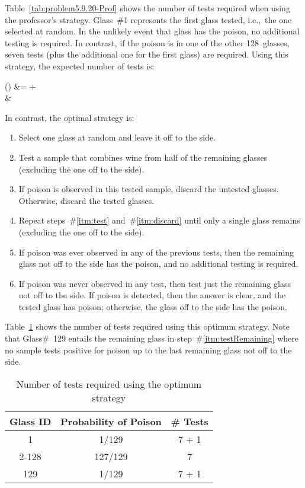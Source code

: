Table~\ref{tab:problem5.9.20-Prof} shows the number of tests required when using the professor's strategy.  Glass~\#1 represents the first glass tested, i.e.,~the one selected at random.  In the unlikely event that glass has the poison, no additional testing is required. In contrast, if the poison is in one of the other 128~glasses, seven tests (plus the additional one for the first glass) are required.  Using this strategy, the expected number of tests is:

\begin{aligncustom}
  () &=   +   \\
                                          &\approx {}
\end{aligncustom}


In contrast, the optimal strategy is:

\begin{enumerate}
  \item Select one glass at random and leave it off to the side.
  \item\label{itm:test} Test a sample that combines wine from half of the remaining glasses (excluding the one off to the side).
  \item\label{itm:discard} If poison is observed in this tested sample, discard the untested glasses.  Otherwise, discard the tested glasses.
  \item Repeat steps~\#\ref{itm:test} and~\#\ref{itm:discard} until only a single glass remains (excluding the one off to the side).
  \item If poison was ever observed in any of the previous tests, then the remaining glass not off to the side has the poison, and no additional testing is required.
  \item\label{itm:testRemaining} If poison was never observed in any test, then test just the remaining glass not off to the side. If poison is detected, then the answer is clear, and the tested glass has poison; otherwise, the glass off to the side has the poison.
\end{enumerate}

Table~\ref{tab:problem5.9.20-Opt} shows the number of tests required using this optimum strategy.    Note that Glass\#~129 entails the remaining glass in step~\#\ref{itm:testRemaining} where no sample tests positive for poison up to the last remaining glass not off to the side.

\begin{table}[h]
  \centering
  \begin{tabular}{c|c|c}
    \hline
    Glass ID & Probability of Poison & \# Tests  \\\hline
    1        & 1/129                 & 7 + 1     \\\hline
    2-128    & 127/129               & 7         \\\hline
    129      & 1/129                 & 7 + 1     \\\hline
  \end{tabular}
  \caption{Number of tests required using the optimum strategy}\label{tab:problem5.9.20-Opt}
\end{table}

